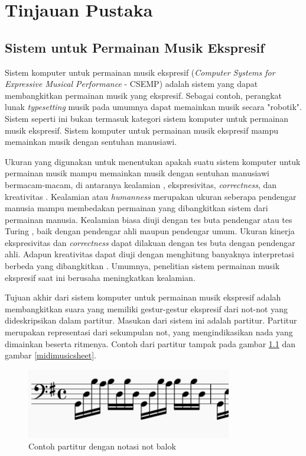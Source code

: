 \chapter{Tinjauan Pustaka}

\section{Sistem untuk Permainan Musik Ekspresif}

Sistem komputer untuk permainan musik ekspresif (\textit{Computer Systems for Expressive Musical Performance} - CSEMP) adalah sistem yang dapat membangkitkan permainan musik yang ekspresif. Sebagai contoh, perangkat lunak \textit{typesetting} musik pada umumnya dapat memainkan musik secara "robotik". Sistem seperti ini bukan termasuk kategori sistem komputer untuk permainan musik ekspresif. Sistem komputer untuk permainan musik ekspresif mampu memainkan musik dengan sentuhan manusiawi. \parencite{miranda2010}

Ukuran yang digunakan untuk menentukan apakah suatu sistem komputer untuk permainan musik mampu memainkan musik dengan sentuhan manusiawi bermacam-macam, di antaranya kealamian \parencite{schubert2017test}, ekspresivitas, \textit{correctness}, dan kreativitas \parencite{miranda2010}. Kealamian atau \textit{humanness} merupakan ukuran seberapa pendengar manusia mampu membedakan permainan yang dibangkitkan sistem dari permainan manusia. Kealamian biasa diuji dengan tes buta pendengar atau tes Turing \parencite{schubert2017test}, baik dengan pendengar ahli maupun pendengar umum. Ukuran kinerja ekspresivitas dan \textit{correctness} dapat dilakuan dengan tes buta dengan pendengar ahli. Adapun kreativitas dapat diuji dengan menghitung banyaknya interpretasi berbeda yang dibangkitkan \parencite{miranda2010}. Umumnya, penelitian sistem permainan musik ekspresif saat ini berusaha meningkatkan kealamian.

Tujuan akhir dari sistem komputer untuk permainan musik ekspresif adalah membangkitkan suara yang memiliki gestur-gestur ekspresif dari not-not yang dideskripsikan dalam partitur. Masukan dari sistem ini adalah partitur. Partitur merupakan representasi dari sekumpulan not, yang mengindikasikan nada yang dimainkan beserta ritmenya. Contoh dari partitur tampak pada gambar \ref{humanmusicsheet} dan gambar \ref{midimusicsheet}.

\begin{figure}[h]
    \centering
    \includegraphics[width=0.8\textwidth]{resources/sheet-example-human.png}
    \caption{Contoh partitur dengan notasi not balok} \label{humanmusicsheet}
\end{figure}

